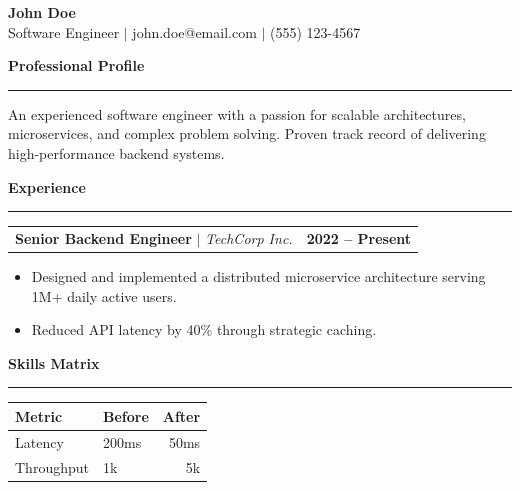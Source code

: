 \documentclass[10pt,a4paper]{article}
\begin{document}
\begin{center}
    {\huge \textbf{John Doe}} \\
    \vspace{2mm}
    Software Engineer $\vert$ john.doe@email.com $\vert$ (555) 123-4567
\end{center}

\vspace{2mm}
\noindent\textbf{\large Professional Profile}
\vspace{-2mm}
\rule{\linewidth}{0.5pt}

An experienced software engineer with a passion for scalable architectures, microservices, and complex problem solving. Proven track record of delivering high-performance backend systems.

\vspace{3mm}
\noindent\textbf{\large Experience}
\vspace{-2mm}
\rule{\linewidth}{0.5pt}

\noindent
\begin{tabularx}{\linewidth}{@{}Xr@{}}
\textbf{Senior Backend Engineer} $\vert$ \textit{TechCorp Inc.} & \textbf{2022 -- Present} \\
\end{tabularx}
\vspace{-2mm}
\begin{itemize}[leftmargin=*,noitemsep]
    \item Designed and implemented a distributed microservice architecture serving 1M+ daily active users.
    \item Reduced API latency by 40\% through strategic caching.
\end{itemize}

\vspace{3mm}
\noindent\textbf{\large Skills Matrix}
\vspace{-2mm}
\rule{\linewidth}{0.5pt}

\begin{center}
\begin{tabular}{llr}
\toprule
Metric & Before & After \\
\midrule
Latency & 200ms & 50ms \\
Throughput & 1k & 5k \\
\bottomrule
\end{tabular}
\end{center}
\end{document}
